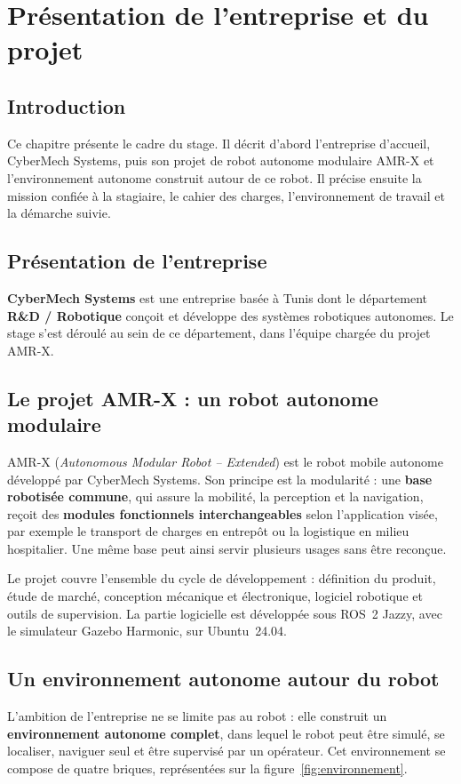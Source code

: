 \chapter{Présentation de l'entreprise et du projet}

\section*{Introduction}
Ce chapitre présente le cadre du stage. Il décrit d'abord l'entreprise d'accueil,
CyberMech Systems, puis son projet de robot autonome modulaire AMR-X et l'environnement
autonome construit autour de ce robot. Il précise ensuite la mission confiée à la
stagiaire, le cahier des charges, l'environnement de travail et la démarche suivie.

\section{Présentation de l'entreprise}
\textbf{CyberMech Systems} est une entreprise basée à Tunis dont le département
\textbf{R\&D / Robotique} conçoit et développe des systèmes robotiques autonomes. Le stage
s'est déroulé au sein de ce département, dans l'équipe chargée du projet AMR-X.


\section{Le projet AMR-X : un robot autonome modulaire}
AMR-X (\emph{Autonomous Modular Robot -- Extended}) est le robot mobile autonome
développé par CyberMech Systems. Son principe est la modularité : une \textbf{base
robotisée commune}, qui assure la mobilité, la perception et la navigation, reçoit des
\textbf{modules fonctionnels interchangeables} selon l'application visée, par exemple le
transport de charges en entrepôt ou la logistique en milieu hospitalier. Une même base
peut ainsi servir plusieurs usages sans être reconçue.

Le projet couvre l'ensemble du cycle de développement : définition du produit, étude de
marché, conception mécanique et électronique, logiciel robotique et outils de
supervision. La partie logicielle est développée sous ROS~2 Jazzy, avec le simulateur
Gazebo Harmonic, sur Ubuntu~24.04.

\section{Un environnement autonome autour du robot}
L'ambition de l'entreprise ne se limite pas au robot : elle construit un
\textbf{environnement autonome complet}, dans lequel le robot peut être simulé, se
localiser, naviguer seul et être supervisé par un opérateur. Cet environnement se compose
de quatre briques, représentées sur la figure~\ref{fig:environnement}.

